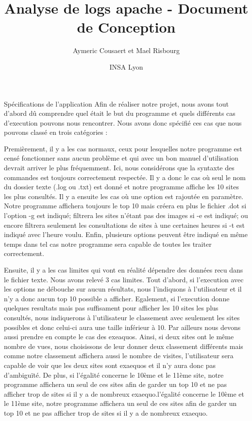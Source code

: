 \documentclass{article}
\date{INSA Lyon}
\title{Analyse de logs apache - Document de Conception}
\author{Aymeric Cousaert et Mael Risbourg}
\begin{document}
\maketitle

\vspace{1cm}
\tableofcontents
\vspace{1cm}

\begin{section}{Spécifications de l'application}
Afin de réaliser notre projet, nous avons tout d'abord dû comprendre quel était le but du programme et quels différents cas d'execution pouvons nous rencontrer. Nous avons donc spécifié ces cas  que nous pouvons classé en trois catégories :

Premièrement, il y a les cas normaux, ceux pour lesquelles notre programme est censé fonctionner sans aucun problème et qui avec un bon manuel d'utilisation devrait arriver le plus fréquemment. Ici, nous considérons que la syntaxte des commandes est toujours correctement respectée. Il y a donc le cas où seul le nom du dossier texte (.log ou .txt) est donné et notre programme affiche les 10 sites les plus consultés. Il y a ensuite les cas où une option est rajoutée en paramètre. Notre programme affichera toujours le top 10 mais créera en plus le fichier .dot si l'option -g est indiqué; filtrera les sites n'étant pas des images si -e est indiqué; ou encore filtrera seulement les consultations de sites à une certaines heures si -t est indiqué avec l'heure voulu. Enfin, plusieurs options peuvent être indiqué en même temps dans tel cas notre programme sera capable de toutes les traiter correctement.

Ensuite, il y a les cas limites qui vont en réalité dépendre des données recu dans le fichier texte. Nous avons relevé 3 cas limites. Tout d'abord, si l'execution avec les options ne débouche sur aucun résultats, nous l'indiquons à l'utilisateur et il n'y a donc aucun top 10 possible a afficher. Egalement, si l'execution donne quelques resultats mais pas suffisament pour afficher les 10 sites les plus consultés, nous indiquerons à l'utilisateur le classement avec seulement les sites possibles et donc celui-ci aura une taille inférieur à 10. Par ailleurs nous devons aussi prendre en compte le cas des exeaquos. Ainsi, si deux sites ont le même nombre de vues, nous choisissons de leur donner deux classement différents mais comme notre classement affichera aussi le nombre de visites, l'utilisateur sera capable de voir que les deux sites sont exaequos et il n'y aura donc pas d'ambiguïté. De plus, si l'égalité concerne le 10ème et le 11ème site, notre programme affichera un seul de ces sites afin de garder un top 10 et ne pas afficher trop de sites si il y a de nombreux exaequo.l'égalité concerne le 10ème et le 11ème site, notre programme affichera un seul de ces sites afin de garder un top 10 et ne pas afficher trop de sites si il y a de nombreux exaequo.


\end{section}
\end{document}
